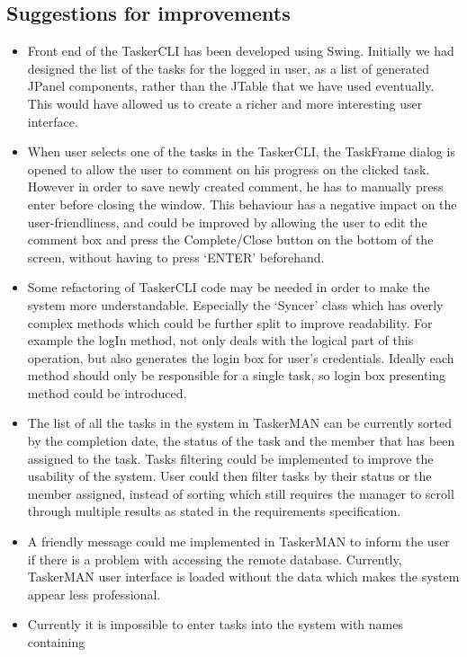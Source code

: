\documentclass{project}
\begin{document}
\subsection{Suggestions for improvements}
\begin{itemize}
  \item Front end of the TaskerCLI has been developed using Swing. Initially we had
    designed the list of the tasks for the logged in user, as a list of generated
    JPanel components, rather than the JTable that we have used eventually. This would
    have allowed us to create a richer and more interesting user interface. 
  \item When user selects one of the tasks in the TaskerCLI, the TaskFrame dialog 
    is opened to allow the user to comment on his progress on the clicked task. However
    in order to save newly created comment, he has to manually press enter before closing
    the window. This behaviour has a negative impact on the user-friendliness, and could
    be improved by allowing the user to edit the comment box and press the Complete/Close
    button on the bottom of the screen, without having to press  `ENTER' beforehand.
  \item Some refactoring of TaskerCLI code may be needed in order to make the system more
    understandable. Especially the  `Syncer' class which has overly complex methods which
    could be further split to improve readability. For example the logIn method, not
    only deals with the logical part of this operation, but also generates the login
    box for user's credentials. Ideally each method should only be responsible for 
    a single task, so login box presenting method could be introduced.
  \item The list of all the tasks in the system in TaskerMAN can be currently sorted
    by the completion date, the status of the task and the member that has been assigned
    to the task. Tasks filtering could be implemented to improve the usability of the
    system. User could then filter tasks by their status or the member assigned, instead
    of sorting which still requires the manager to scroll through multiple results as stated in the requirements specification\cite{se.qa.rs}. 
  \item A friendly message could me implemented in TaskerMAN to inform the user if there
    is a problem with accessing the remote database. Currently, TaskerMAN user interface
    is loaded without the data which makes the system appear less professional. 
  \item Currently it is impossible to enter tasks into the system with names containing

\end{itemize}
\end{document}
